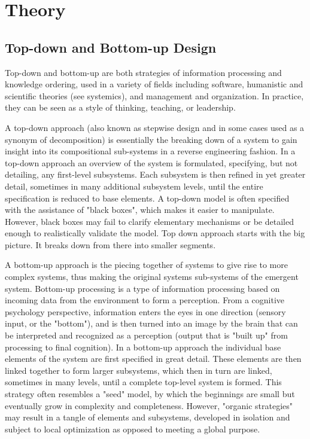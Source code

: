 \documentclass[12pt,a4paper,titlepage]{article}
\begin{document}
\section{Theory}

\subsection{Top-down and Bottom-up Design}
Top-down and bottom-up are both strategies of information processing and knowledge ordering, used in a variety of fields including software, humanistic and scientific theories (see systemics), and management and organization. In practice, they can be seen as a style of thinking, teaching, or leadership.\par
A top-down approach (also known as stepwise design and in some cases used as a synonym of decomposition) is essentially the breaking down of a system to gain insight into its compositional sub-systems in a reverse engineering fashion. In a top-down approach an overview of the system is formulated, specifying, but not detailing, any first-level subsystems. Each subsystem is then refined in yet greater detail, sometimes in many additional subsystem levels, until the entire specification is reduced to base elements. A top-down model is often specified with the assistance of "black boxes", which makes it easier to manipulate. However, black boxes may fail to clarify elementary mechanisms or be detailed enough to realistically validate the model. Top down approach starts with the big picture. It breaks down from there into smaller segments.\par
A bottom-up approach is the piecing together of systems to give rise to more complex systems, thus making the original systems sub-systems of the emergent system. Bottom-up processing is a type of information processing based on incoming data from the environment to form a perception. From a cognitive psychology perspective, information enters the eyes in one direction (sensory input, or the "bottom"), and is then turned into an image by the brain that can be interpreted and recognized as a perception (output that is "built up" from processing to final cognition). In a bottom-up approach the individual base elements of the system are first specified in great detail. These elements are then linked together to form larger subsystems, which then in turn are linked, sometimes in many levels, until a complete top-level system is formed. This strategy often resembles a "seed" model, by which the beginnings are small but eventually grow in complexity and completeness. However, "organic strategies" may result in a tangle of elements and subsystems, developed in isolation and subject to local optimization as opposed to meeting a global purpose.\par
\clearpage
\end{document}
